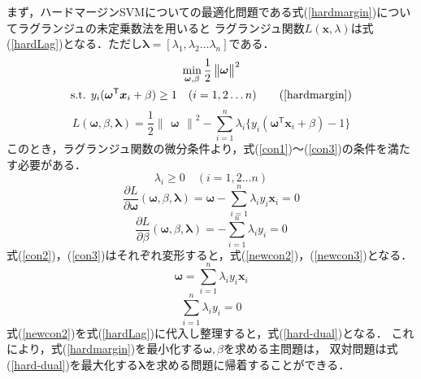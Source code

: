 \documentclass[11pt,a4paper,titlepage]{ltjsarticle}
\begin{document}
まず，ハードマージンSVMについての最適化問題である式(\ref{hardmargin})についてラグランジュの未定乗数法を用いると
ラグランジュ関数$L(\bm{x},\lambda)$は式(\ref{hardLag})となる．ただし$\bm{\lambda} = [\lambda_1,\lambda_2\dots\lambda_n]$である．
\begin{equation}
    \begin{gathered}
        \min_{\bm{\omega},\beta}\frac{1}{2}\begin{Vmatrix}\bm{\omega}\end{Vmatrix}^2\\
        \text{s.t. } y_i(\bm{\omega}^\mathsf{T}\bm{x}_i + \beta) \geq 1 \quad (i=1,2\dots n) \tag{\ref{hardmargin}}
    \end{gathered}
\end{equation}
\begin{equation}
    \label{hardLag}
    L(\bm{\omega},\beta,\bm{\lambda}) = \frac{1}{2}\begin{Vmatrix}\bm{\omega}\end{Vmatrix}^2 - \sum_{i=1}^{n}\lambda_i\{y_i(\bm{\omega}^\mathsf{T}\bm{x}_i + \beta) - 1\}
\end{equation}
このとき，ラグランジュ関数の微分条件より，式(\ref{con1})～(\ref{con3})の条件を満たす必要がある．
\begin{equation}
    \label{con1}
    \lambda_i \geq 0 \quad  (i =1,2\dots n)
\end{equation}
\begin{equation}
    \label{con2}
    \frac{\partial L}{\partial \bm{\omega}}(\bm{\omega},\beta,\bm{\lambda}) = \bm{\omega} - \sum_{i=1}^{n}\lambda_iy_i\bm{x}_i = 0
\end{equation}
\begin{equation}
    \label{con3}
    \frac{\partial L}{\partial \beta}(\bm{\omega},\beta,\bm{\lambda}) = -\sum_{i=1}^{n}\lambda_iy_i = 0    
\end{equation}
式(\ref{con2})，(\ref{con3})はそれぞれ変形すると，式(\ref{newcon2})，(\ref{newcon3})となる．
\begin{equation}
    \label{newcon2}
    \bm{\omega} = \sum_{i=1}^{n}\lambda_iy_i\bm{x}_i
\end{equation}
\begin{equation}
    \label{newcon3}
    \sum_{i=1}^{n}\lambda_iy_i = 0
\end{equation}
式(\ref{newcon2})を式(\ref{hardLag})に代入し整理すると，式(\ref{hard-dual})となる．
これにより，式(\ref{hardmargin})を最小化する$\bm{\omega},\beta$を求める主問題は，
双対問題は式(\ref{hard-dual})を最大化する$\bm{\lambda}$を求める問題に帰着することができる．
\end{document}
